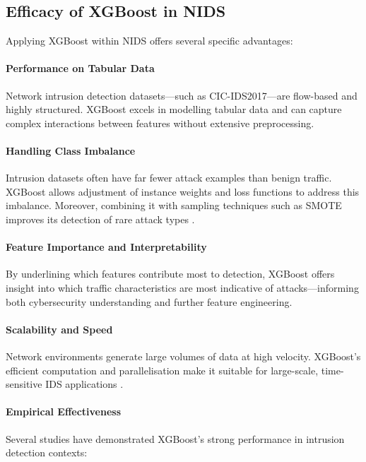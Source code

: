 \subsection{Efficacy of XGBoost in NIDS}

Applying XGBoost within NIDS offers several specific advantages:

\paragraph{Performance on Tabular Data} Network intrusion detection datasets—such as CIC-IDS2017—are flow-based and highly structured. XGBoost excels in modelling tabular data and can capture complex interactions between features without extensive preprocessing.

\paragraph{Handling Class Imbalance} Intrusion datasets often have far fewer attack examples than benign traffic. XGBoost allows adjustment of instance weights and loss functions to address this imbalance. Moreover, combining it with sampling techniques such as SMOTE improves its detection of rare attack types \parencite{turn0search11}.

\paragraph{Feature Importance and Interpretability} By underlining which features contribute most to detection, XGBoost offers insight into which traffic characteristics are most indicative of attacks—informing both cybersecurity understanding and further feature engineering.

\paragraph{Scalability and Speed} Network environments generate large volumes of data at high velocity. XGBoost’s efficient computation and parallelisation make it suitable for large-scale, time-sensitive IDS applications \parencite{turn0search0}.

\paragraph{Empirical Effectiveness} Several studies have demonstrated XGBoost’s strong performance in intrusion detection contexts:

